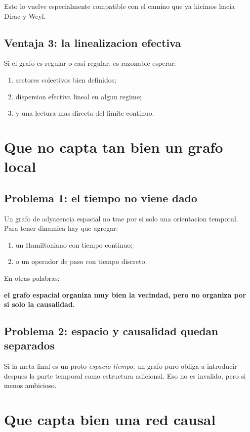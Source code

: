 Esto lo vuelve especialmente compatible con el camino que ya hicimos hacia Dirac y Weyl.

\subsection{Ventaja 3: la linealizacion efectiva}
Si el grafo es regular o casi regular, es razonable esperar:
\begin{enumerate}[label=\arabic*.]
    \item sectores colectivos bien definidos;
    \item dispersion efectiva lineal en algun regime;
    \item y una lectura mas directa del limite continuo.
\end{enumerate}

\section{Que no capta tan bien un grafo local}
\subsection{Problema 1: el tiempo no viene dado}
Un grafo de adyacencia espacial no trae por si solo una orientacion temporal. Para tener dinamica hay que agregar:
\begin{enumerate}[label=\arabic*.]
    \item un Hamiltoniano con tiempo continuo;
    \item o un operador de paso con tiempo discreto.
\end{enumerate}

En otras palabras:
\begin{displayquote}
\textbf{el grafo espacial organiza muy bien la vecindad, pero no organiza por si solo la causalidad.}
\end{displayquote}

\subsection{Problema 2: espacio y causalidad quedan separados}
Si la meta final es un proto-\emph{espacio-tiempo}, un grafo puro obliga a introducir despues la parte temporal como estructura adicional. Eso no es invalido, pero si menos ambicioso.

\section{Que capta bien una red causal}

